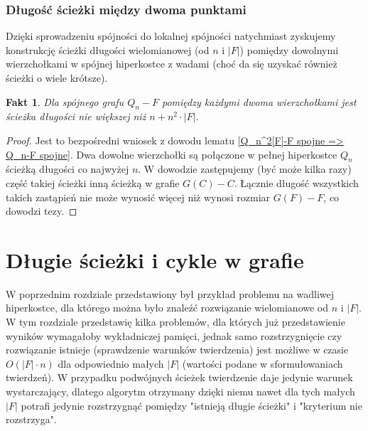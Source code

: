 \documentclass{pracamgr}
\newtheorem{fact}[theorem]{Fakt}
\begin{document}
   \subsection{Długość ścieżki między dwoma punktami}
    Dzięki sprowadzeniu spójności do lokalnej spójności natychmiast zyskujemy konstrukcję ścieżki długości wielomianowej (od $n$ i $|F|$) pomiędzy dowolnymi
    wierzchołkami w spójnej hiperkostce z wadami (choć da się uzyskać również ścieżki o wiele krótsze).
    \begin{fact}
     Dla spójnego grafu $Q_n-F$ pomiędzy każdymi dwoma wierzchołkami jest ścieżka długości nie większej niż $n+n^2\cdot|F|$.
    \end{fact}
    \begin{proof}
     Jest to bezpośredni wniosek z dowodu lematu \ref{Q_n^2[F]-F spojne => Q_n-F spojne}. Dwa dowolne wierzchołki są połączone w pełnej hiperkostce $Q_n$
     ścieżką długości co najwyżej $n$. W dowodzie zastępujemy (być może kilka razy)
     część takiej ścieżki inną ścieżką w grafie $G(C)-C$. Łącznie długość wszystkich takich zastąpień nie może wynosić więcej niż wynosi rozmiar $G(F)-F$,
     co dowodzi tezy.
    \end{proof}

 \chapter{Długie ścieżki i cykle w grafie}
  W poprzednim rozdziale przedstawiony był przykład problemu na wadliwej hiperkostce, dla którego można było znaleźć rozwiązanie wielomianowe od $n$ i $|F|$.
  W tym rozdziale przedstawię kilka problemów, dla których już przedstawienie wyników wymagałoby wykładniczej pamięci,
  jednak samo rozstrzygnięcie czy rozwiązanie istnieje (sprawdzenie warunków twierdzenia) jest możliwe w czasie
  $O(|F|\cdot n)$ dla odpowiednio małych $|F|$ (wartości podane w sformułowaniach twierdzeń).
  W przypadku podwójnych ścieżek twierdzenie daje jedynie warunek wystarczający, dlatego algorytm otrzymany dzięki niemu nawet dla tych małych $|F|$ potrafi
  jedynie rozstrzygnąć pomiędzy "istnieją długie ścieżki" i "kryterium nie rozstrzyga".
\end{document}
